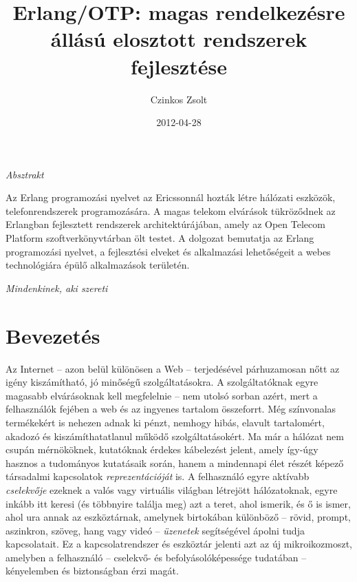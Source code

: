 \documentclass[12pt, a4paper, oneside]{book}
\author{Czinkos Zsolt}
\title{Erlang/OTP: magas rendelkezésre állású elosztott rendszerek fejlesztése}
\date{2012-04-28}
\newenvironment{abstract}
{\newpage \pagestyle{empty} \vspace*{\fill} \begin{center}\em{Absztrakt}\end{center}}
{\vspace*{\fill} \newpage}
\begin{document}
\maketitle

\onehalfspacing

\begin{abstract}
Az Erlang programozási nyelvet az Ericssonnál hozták létre hálózati
eszközök, telefonrendszerek programozására. A magas telekom elvárások
tükröződnek az Erlangban fejlesztett rendszerek architektúrájában,
amely az Open Telecom Platform szoftverkönyvtárban ölt testet. A dolgozat
bemutatja az Erlang programozási nyelvet, a fejlesztési elveket és
alkalmazási lehetőségeit a webes technológiára épülő alkalmazások területén.
\end{abstract}

\newpage
\pagestyle{empty}
\vspace*{\fill} 
\hfill \emph{Mindenkinek, aki szereti}
\vspace*{\fill} 
\newpage

\pagestyle{fancy}

\tableofcontents

\chapter{Bevezetés}

Az Internet -- azon belül különösen a Web -- terjedésével párhuzamosan nőtt az
igény kiszámítható, jó minőségű szolgáltatásokra. A szolgáltatóknak egyre
magasabb elvárásoknak kell megfelelnie -- nem utolsó sorban azért, mert a
felhasználók fejében a web és az ingyenes tartalom összeforrt. Még színvonalas
termékekért is nehezen adnak ki pénzt, nemhogy hibás, elavult tartalomért,
akadozó és kiszámíthatatlanul működő szolgáltatásokért. Ma már a hálózat nem
csupán mérnököknek, kutatóknak érdekes kábelezést jelent, amely így-úgy hasznos
a tudományos kutatásaik során, hanem a mindennapi élet részét képező társadalmi
kapcsolatok \textit{reprezentációját} is. A felhasználó egyre aktívabb
\textit{cselekvője} ezeknek a valós vagy virtuális világban létrejött
hálózatoknak, egyre inkább itt keresi (és többnyire találja meg) azt a teret,
ahol ismerik, és ő is ismer, ahol ura annak az eszköztárnak, amelynek
birtokában különböző -- rövid, prompt, aszinkron, szöveg, hang vagy videó --
\textit{üzenetek} segítségével ápolni tudja kapcsolatait. Ez a
kapcsolatrendszer és eszköztár jelenti azt az új mikroikozmoszt, amelyben a
felhasználó -- cselekvő- és befolyásolóképessége tudatában -- kényelemben és
biztonságban érzi magát.
\end{document}
